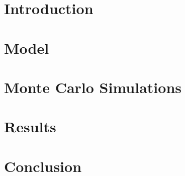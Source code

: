 \documentclass[a4paper,headsepline,bibtotocnumbered,12pt,titlepage,twoside]{scrartcl} %
\begin{document}
    
    \thispagestyle{empty}
    \cleardoublepage
    \setcounter{page}{1}
    \tableofcontents
    \newpage
    \listoffigures
    \newpage
    \setcounter{page}{1}

    \newpage
    \section{Introduction}
        

    \section{Model}
        

    \section{Monte Carlo Simulations}
        

    \section{Results}
        

    \section{Conclusion}
        

    \clearpage
    
    

    \clearpage
    \begin{appendix}
        
    \end{appendix}

    \cleardoublepage
    
\end{document}
